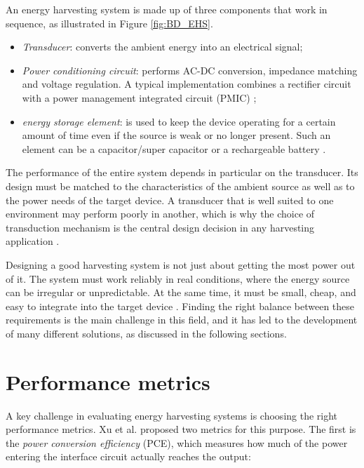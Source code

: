 An energy harvesting system is made up of three components
that work in sequence, as illustrated in
Figure \ref{fig:BD_EHS}.

\begin{itemize}
    \item \emph{Transducer}: converts the ambient energy into an electrical signal;
    \item \emph{Power conditioning circuit}: performs AC-DC conversion, impedance matching and voltage regulation. A typical implementation combines a rectifier circuit with a power management integrated circuit (PMIC) \cite{xuSystemImplementationTradeOffs2021};
    \item \emph{energy storage element}: is used to keep the device operating for a certain amount of time even if the source is weak or no longer present. Such an element can be a capacitor/super capacitor or a rechargeable battery \cite{roundyStudyLowLevel2003a}.
\end{itemize}







The performance of the entire system depends in particular on
the transducer. Its design must be matched to the
characteristics of the ambient source as well as to the power needs
of the target device. A transducer that is well suited to
one environment may perform poorly in another, which is why
the choice of transduction mechanism is the central design
decision in any harvesting application \cite{grossiEnergyHarvestingStrategies2021}.

Designing a good harvesting system is not just about 
getting the most power out of it. The system must work 
reliably in real conditions, where the energy source can 
be irregular or unpredictable. At the same time, it must 
be small, cheap, and easy to integrate into the target 
device \cite{grossiEnergyHarvestingStrategies2021}. Finding 
the right balance between these requirements is the main 
challenge in this field, and it has led to the development 
of many different solutions, as discussed in the following 
sections.

\section{Performance metrics}

A key challenge in evaluating energy harvesting systems is 
choosing the right performance metrics. Xu et 
al. \cite{xuSystemImplementationTradeOffs2021} proposed two metrics
for this purpose. The first is the \emph{power conversion 
efficiency} (PCE), which measures how much of the power 
entering the interface circuit actually reaches the output:


